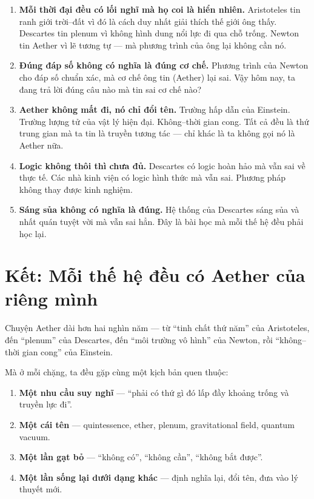 \begin{enumerate}
  \item \textbf{Mỗi thời đại đều có lối nghĩ mà họ coi là hiển nhiên.} Aristoteles tin ranh giới trời--đất vì đó là cách duy nhất giải thích thế giới ông thấy. Descartes tin plenum vì không hình dung nổi lực đi qua chỗ trống. Newton tin Aether vì lẽ tương tự — mà phương trình của ông lại không cần nó.

  \item \textbf{Đúng đáp số không có nghĩa là đúng cơ chế.} Phương trình của Newton cho đáp số chuẩn xác, mà cơ chế ông tin (Aether) lại sai. Vậy hôm nay, ta đang trả lời đúng câu nào mà tin sai cơ chế nào?

  \item \textbf{Aether không mất đi, nó chỉ đổi tên.} Trường hấp dẫn của Einstein. Trường lượng tử của vật lý hiện đại. Không--thời gian cong. Tất cả đều là thứ trung gian mà ta tin là truyền tương tác — chỉ khác là ta không gọi nó là Aether nữa.

  \item \textbf{Logic không thôi thì chưa đủ.} Descartes có logic hoàn hảo mà vẫn sai về thực tế. Các nhà kinh viện có logic hình thức mà vẫn sai. Phương pháp không thay được kinh nghiệm.

  \item \textbf{Sáng sủa không có nghĩa là đúng.} Hệ thống của Descartes sáng sủa và nhất quán tuyệt vời mà vẫn sai hẳn. Đây là bài học mà mỗi thế hệ đều phải học lại.
\end{enumerate}


\section{Kết: Mỗi thế hệ đều có Aether của riêng mình}

Chuyện Aether dài hơn hai nghìn năm — từ “tinh chất thứ năm” của Aristoteles, đến “plenum” của Descartes, đến “môi trường vô hình” của Newton, rồi “không--thời gian cong” của Einstein.

Mà ở mỗi chặng, ta đều gặp cùng một kịch bản quen thuộc:

\begin{enumerate}
  \item \textbf{Một nhu cầu suy nghĩ} — “phải có thứ gì đó lấp đầy khoảng trống và truyền lực đi”.
  \item \textbf{Một cái tên} — quintessence, ether, plenum, gravitational field, quantum vacuum.
  \item \textbf{Một lần gạt bỏ} — “không có”, “không cần”, “không bắt được”.
  \item \textbf{Một lần sống lại dưới dạng khác} — định nghĩa lại, đổi tên, đưa vào lý thuyết mới.
\end{enumerate}

